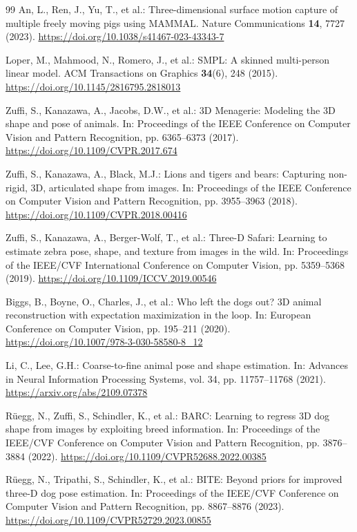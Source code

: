 \documentclass[runningheads]{llncs}
\begin{document}
\begin{thebibliography}{99}
An, L., Ren, J., Yu, T., et al.: Three-dimensional surface motion capture of multiple freely moving pigs using MAMMAL. Nature Communications \textbf{14}, 7727 (2023). \url{https://doi.org/10.1038/s41467-023-43343-7}

Loper, M., Mahmood, N., Romero, J., et al.: SMPL: A skinned multi-person linear model. ACM Transactions on Graphics \textbf{34}(6), 248 (2015). \url{https://doi.org/10.1145/2816795.2818013}

Zuffi, S., Kanazawa, A., Jacobs, D.W., et al.: 3D Menagerie: Modeling the 3D shape and pose of animals. In: Proceedings of the IEEE Conference on Computer Vision and Pattern Recognition, pp. 6365--6373 (2017). \url{https://doi.org/10.1109/CVPR.2017.674}

Zuffi, S., Kanazawa, A., Black, M.J.: Lions and tigers and bears: Capturing non-rigid, 3D, articulated shape from images. In: Proceedings of the IEEE Conference on Computer Vision and Pattern Recognition, pp. 3955--3963 (2018). \url{https://doi.org/10.1109/CVPR.2018.00416}

Zuffi, S., Kanazawa, A., Berger-Wolf, T., et al.: Three-D Safari: Learning to estimate zebra pose, shape, and texture from images in the wild. In: Proceedings of the IEEE/CVF International Conference on Computer Vision, pp. 5359--5368 (2019). \url{https://doi.org/10.1109/ICCV.2019.00546}

Biggs, B., Boyne, O., Charles, J., et al.: Who left the dogs out? 3D animal reconstruction with expectation maximization in the loop. In: European Conference on Computer Vision, pp. 195--211 (2020). \url{https://doi.org/10.1007/978-3-030-58580-8_12}

Li, C., Lee, G.H.: Coarse-to-fine animal pose and shape estimation. In: Advances in Neural Information Processing Systems, vol. 34, pp. 11757--11768 (2021). \url{https://arxiv.org/abs/2109.07378}

Rüegg, N., Zuffi, S., Schindler, K., et al.: BARC: Learning to regress 3D dog shape from images by exploiting breed information. In: Proceedings of the IEEE/CVF Conference on Computer Vision and Pattern Recognition, pp. 3876--3884 (2022). \url{https://doi.org/10.1109/CVPR52688.2022.00385}

Rüegg, N., Tripathi, S., Schindler, K., et al.: BITE: Beyond priors for improved three-D dog pose estimation. In: Proceedings of the IEEE/CVF Conference on Computer Vision and Pattern Recognition, pp. 8867--8876 (2023). \url{https://doi.org/10.1109/CVPR52729.2023.00855}


\end{thebibliography}
\end{document}
